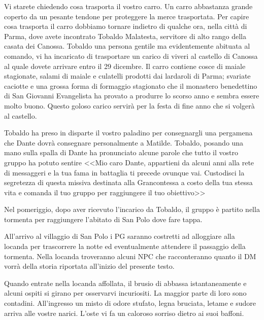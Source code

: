 \documentclass[letterpaper,twocolumn,openany,nodeprecatedcode]{dndbook}
\begin{document}
\begin{DndReadAloud}
Vi starete chiedendo cosa trasporta il vostro carro. Un carro abbastanza grande coperto da un pesante tendone per proteggere la merce trasportata. Per capire cosa trasporta il carro dobbiamo tornare indietro di qualche ora, nella città di Parma, dove avete incontrato Tobaldo Malatesta, servitore di alto rango della casata dei Canossa. Tobaldo una persona gentile ma evidentemente abituata al comando, vi ha incaricato di trasportare un carico di viveri al castello di Canossa al quale dovete arrivare entro il 29 dicembre. Il carro contiene cosce di maiale stagionate, salami di maiale e culatelli prodotti dai lardaroli di Parma; svariate caciotte e una grossa forma di formaggio stagionato che il monastero benedettino di San Giovanni Evangelista ha provato a produrre lo scorso anno e sembra essere molto buono. Questo goloso carico servirà per la festa di fine anno che si volgerà al castello.

Tobaldo ha preso in disparte il vostro paladino per consegnargli una pergamena che Dante dovrà consegnare personalmente a Matilde. Tobaldo, posando una mano sulla spalla di Dante ha pronunciato alcune parole che tutto il vostro gruppo ha potuto sentire <<Mio caro Dante, appartieni da alcuni anni alla rete di messaggeri e la tua fama in battaglia ti precede ovunque vai. Custodisci la segretezza di questa missiva destinata alla Grancontessa a costo della tua stessa vita e comanda il tuo gruppo per raggiungere il tuo obiettivo>>
\end{DndReadAloud}

Nel pomeriggio, dopo aver ricevuto l'incarico da Tobaldo, il gruppo è partito nella tormenta per raggiungere l'abitato di San Polo dove fare tappa.


All'arrivo al villaggio di San Polo i PG saranno costretti ad alloggiare alla locanda per trascorrere la notte ed eventualmente attendere il passaggio della tormenta. Nella locanda troveranno alcuni NPC che racconteranno quanto il DM vorrà della storia riportata all'inizio del presente testo.

\begin{DndReadAloud}
Quando entrate nella locanda affollata, il brusio di abbassa istantaneamente e alcuni ospiti si girano per osservarvi incuriositi. La maggior parte di loro sono contadini. All'ingresso un misto di odore stufato, legna bruciata, letame e sudore arriva alle vostre narici. L'oste vi fa un caloroso sorriso dietro ai suoi baffoni.
\end{DndReadAloud}
\end{document}

